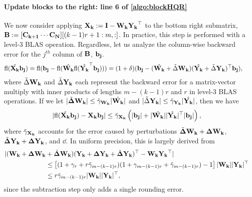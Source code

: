 \paragraph{Update blocks to the right: line 6 of \cref{algo:blockHQR}}
We now consider applying $\mathbf{X_k}:=\mathbf{I}-\mathbf{W_kY_k}^{\top}$ to the bottom right submatrix, $\mathbf{B}:=[\mathbf{C_{k+1}}\cdots \mathbf{C_N}][(k-1)r+1:m,:]$.
In practice, this step is performed with a level-3 BLAS operation. 
Regardless, let us analyze the column-wise backward error for the $j^{th}$ column of $\mathbf{B}$, $\mathbf{b_j}$.
\begin{align*}
	\mathrm{fl}(\hat{\mathbf{X_k}}\mathbf{b_j})=\mathrm{fl}(\mathbf{b_j} - \mathrm{fl}(\hat{\mathbf{W_k}}\mathrm{fl}(\hat{\mathbf{Y_k}}^{\top}\mathbf{b_j}))) & =(1+\delta)(\mathbf{b_j} - (\hat{\mathbf{W_k}} + \tilde{\Delta} \mathbf{W_k}) (\hat{\mathbf{Y_k}} + \tilde{\Delta} \mathbf{Y_k})^{\top}\mathbf{b_j}),
\end{align*}
where $\tilde{\Delta} \mathbf{W_k}$ and $\tilde{\Delta} \mathbf{Y_k}$ each represent the backward error for a matrix-vector multiply with inner products of lengths $m-(k-1)r$ and $r$ in level-3 BLAS operations.
If we let $|\tilde{\mathbf{\Delta}} \mathbf{W_k}| \leq \tilde{\gamma}_{\mathbf{W_k}}|\hat{\mathbf{W_k}}|$ and $|\tilde{\Delta} \mathbf{Y_k}| \leq \tilde{\gamma}_{\mathbf{Y_k}}|\hat{\mathbf{Y_k}}|$, then we have 
\begin{equation*}
	|\mathrm{fl}(\hat{\mathbf{X_k}}\mathbf{b_j}) - \mathbf{X_kb_j}| \leq \tilde{\gamma}_{\mathbf{X_k}} \left(|\mathbf{b_j}|+|\hat{\mathbf{W_k}}||\hat{\mathbf{Y_k}}|^{\top}|\mathbf{b_j}|\right),
\end{equation*}
where $\tilde{\gamma}_{\mathbf{X_k}}$ accounts for the error caused by perturbations $\tilde{\mathbf{\Delta}}{\mathbf{W_k}}+\mathbf{\Delta W_k}$, $\tilde{\mathbf{\Delta}}\mathbf{Y_k} + \mathbf{\Delta Y_k}$, and $\dd$.
In uniform precision, this is largely derived from 
\begin{align*}
	|(\mathbf{W_k} +\mathbf{\Delta W_k} &+ \tilde{\mathbf{\Delta}} \mathbf{W_k}) (\mathbf{Y_k} + \mathbf{\Delta Y_k} + \tilde{\mathbf{\Delta}} \mathbf{Y_k})^{\top} - \mathbf{W_k} \mathbf{Y_k}^{\top}| \\
	 &\leq \left[(1+ \gamma_{r}+r\tilde{\gamma}_{m-(k-1)r})(1+ \gamma_{m-(k-1)r} + \tilde{\gamma}_{m-(k-1)r})-1\right]|\mathbf{W_k}||\mathbf{Y_k}|^{\top} \\ 
	 &\leq r\tilde{\gamma}_{m-(k-1)r}|\mathbf{W_k}||\mathbf{Y_k}|^{\top},
\end{align*}
since the subtraction step only adds a single rounding error. 
